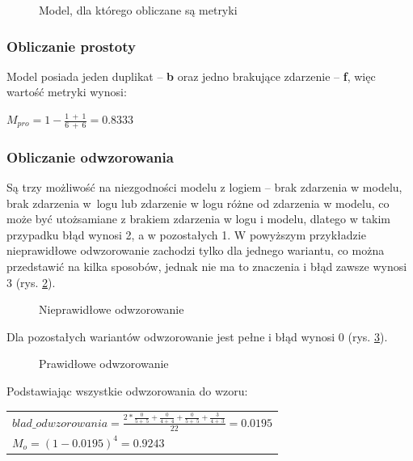 \begin{figure}[h]
	\caption{\label{fig:metrics_business_process}Model, dla którego obliczane są metryki}
\end{figure}

\subsubsection{Obliczanie prostoty}
Model posiada jeden duplikat -- \textbf{b} oraz jedno brakujące zdarzenie -- \textbf{f}, więc wartość metryki wynosi:
\begin{center}
$M_{pro} = 1 - \frac{1\ +\ 1}{6\ +\ 6} = 0.8333$
\end{center}

\subsubsection{Obliczanie odwzorowania}
\label{sec:alignment-calculation}
Są trzy możliwość na niezgodności modelu z logiem -- brak zdarzenia w modelu, brak zdarzenia w~logu lub zdarzenie w logu różne od zdarzenia w modelu, co może być utożsamiane z brakiem zdarzenia w logu i modelu, dlatego w takim przypadku błąd wynosi 2, a w pozostałych 1. W powyższym przykładzie nieprawidłowe odwzorowanie zachodzi tylko dla jednego wariantu, co można przedstawić na kilka sposobów, jednak nie ma to znaczenia i błąd zawsze wynosi 3 (rys. \ref{fig:bad-alignment}).
\newline
\newline
\begin{figure}[H]
	\caption{\label{fig:bad-alignment}Nieprawidłowe odwzorowanie}
\end{figure}
Dla pozostałych wariantów odwzorowanie jest pełne i błąd wynosi 0 (rys. \ref{fig:good-alignment}).
\begin{figure}[H]
	\caption{\label{fig:good-alignment}Prawidłowe odwzorowanie}
\end{figure}
Podstawiając wszystkie odwzorowania do wzoru:
\begin{center}
\begin{tabular}{l}
$blad\_odwzorowania = \frac{2 * \frac{0}{5 +\ 5} + \frac{0}{4 +\ 4} + \frac{0}{5 +\ 5} + \frac{3}{4 +\ 3}}{22} = 0.0195$ \\

$M_o = (1 - 0.0195)^4 = 0.9243$
\end{tabular}
\end{center}

